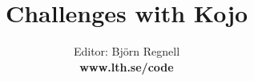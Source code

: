 \documentclass[12pt]{book}
\title{\fontsize{40}{40}\bf\sffamily\selectfont Challenges with Kojo}
\author{Editor: Björn Regnell \\ \bf www.lth.se/code}
\date{}
\begin{document}
\maketitle
\newpage
\thispagestyle{empty}



\newpage
\begin{multicols}{3}
\tableofcontents 
\mainmatter
\end{multicols}

\fontsize{16}{18}\selectfont\raggedright


\end{document}
